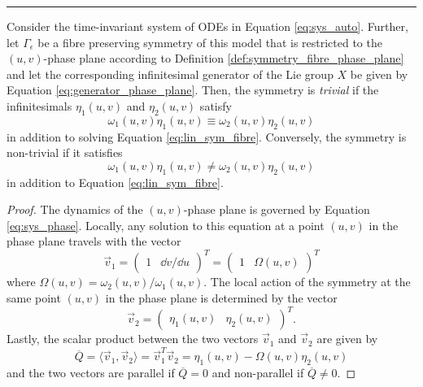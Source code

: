 \hrule
\begin{theorem}
  Consider the time-invariant system of ODEs in Equation \eqref{eq:sys_auto}. Further, let $\Gamma_\epsilon$ be a fibre preserving symmetry of this model that is restricted to the $(u,v)$-phase plane according to Definition \ref{def:symmetry_fibre_phase_plane} and let the corresponding infinitesimal generator of the Lie group $X$ be given by Equation \eqref{eq:generator_phase_plane}. Then, the symmetry is \textit{trivial} if the infinitesimals $\eta_1(u,v)$ and $\eta_2(u,v)$ satisfy
  \begin{equation}
    \omega_1(u,v)\eta_1(u,v)\equiv\omega_2(u,v)\eta_2(u,v)
    \label{eq:trivial_symmetry}
    \end{equation}
    in addition to solving Equation \eqref{eq:lin_sym_fibre}. Conversely, the symmetry is non-trivial if it satisfies
  \begin{equation}
    \omega_1(u,v)\eta_1(u,v)\neq\omega_2(u,v)\eta_2(u,v)
    \label{eq:nontrivial_symmetry}
    \end{equation}    
in addition to Equation \eqref{eq:lin_sym_fibre}.
\label{thm:trivial_and_nontrivial}
\end{theorem}
  \dotfill
\begin{proof}
  The dynamics of the $(u,v)$-phase plane is governed by Equation \eqref{eq:sys_phase}. Locally, any solution to this equation at a point $(u,v)$ in the phase plane travels with the vector
  $$\vec{v}_1=\begin{pmatrix}1 & \dd v/\dd u\end{pmatrix}^T=\begin{pmatrix}1 & \Omega(u,v)\end{pmatrix}^T$$
  where $\Omega(u,v)=\omega_2(u,v)/\omega_1(u,v)$. The local action of the symmetry at the same point $(u,v)$ in the phase plane is determined by the vector
  $$\vec{v}_2=\begin{pmatrix}\eta_1(u,v) & \eta_2(u,v)\end{pmatrix}^T.$$
  Lastly, the scalar product between the two vectors $\vec{v}_1$ and $\vec{v}_2$ are given by
  \begin{equation}
    \overline{Q}=\langle\vec{v}_1,\vec{v}_2\rangle=\vec{v}_1^T\vec{v}_2=\eta_1(u,v)-\Omega(u,v)\eta_2(u,v)
    \label{eq:characteristic}
    \end{equation}
  and the two vectors are parallel if $\overline{Q}=0$ and non-parallel if $\overline{Q}\neq 0$.
  
\end{proof}
